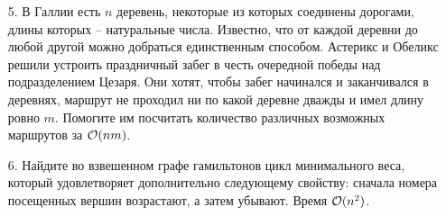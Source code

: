 \begin{enumerate}
  \item[5.] 
    В Галлии есть $n$ деревень, некоторые из которых соединены дорогами, длины которых --
    натуральные числа. Известно, что от каждой деревни до любой другой можно добраться
    единственным способом. Астерикс и Обеликс решили устроить праздничный забег в честь
    очередной победы над подразделением Цезаря. Они хотят, чтобы забег начинался и заканчивался
    в деревнях, маршрут не проходил ни по какой деревне дважды и имел длину ровно $m$.
    Помогите им посчитать количество различных возможных маршрутов за $\mathcal{O}(nm)$.

  \item[6.]
    Найдите во взвешенном графе гамильтонов цикл
    минимального веса, который удовлетворяет дополнительно следующему свойству: сначала
    номера посещенных вершин возрастают, а затем убывают. Время $\mathcal{O}(n^2)$.






\end{enumerate}

